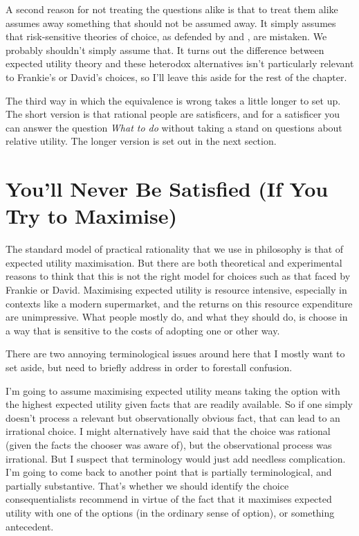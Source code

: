\documentclass[11pt,]{book}
\begin{document}
A second reason for not treating the questions alike is that to treat them alike assumes away something that should not be assumed away. It simply assumes that risk-sensitive theories of choice, as defended by \citet{Quiggin1982} and \citet{BuchakRisk}, are mistaken. We probably shouldn't simply assume that. It turns out the difference between expected utility theory and these heterodox alternatives isn't particularly relevant to Frankie's or David's choices, so I'll leave this aside for the rest of the chapter.

The third way in which the equivalence is wrong takes a little longer to set up. The short version is that rational people are satisficers, and for a satisficer you can answer the question \emph{What to do} without taking a stand on questions about relative utility. The longer version is set out in the next section.

\hypertarget{satisfied}{%
\section{You'll Never Be Satisfied (If You Try to Maximise)}\label{satisfied}}

The standard model of practical rationality that we use in philosophy is that of expected utility maximisation. But there are both theoretical and experimental reasons to think that this is not the right model for choices such as that faced by Frankie or David. Maximising expected utility is resource intensive, especially in contexts like a modern supermarket, and the returns on this resource expenditure are unimpressive. What people mostly do, and what they should do, is choose in a way that is sensitive to the costs of adopting one or other way.

There are two annoying terminological issues around here that I mostly want to set aside, but need to briefly address in order to forestall confusion.

I'm going to assume maximising expected utility means taking the option with the highest expected utility given facts that are readily available. So if one simply doesn't process a relevant but observationally obvious fact, that can lead to an irrational choice. I might alternatively have said that the choice was rational (given the facts the chooser was aware of), but the observational process was irrational. But I suspect that terminology would just add needless complication. I'm going to come back to another point that is partially terminological, and partially substantive. That's whether we should identify the choice consequentialists recommend in virtue of the fact that it maximises expected utility with one of the options (in the ordinary sense of option), or something antecedent.
\end{document}
